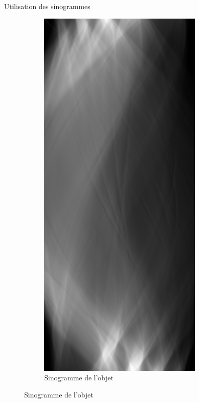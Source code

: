 \documentclass{beamer}
\begin{document}
\begin{frame}{Utilisation des sinogrammes}
\begin{figure}[t]
\begin{subfigure}[b]{0.22\textwidth}
            \includegraphics[width=\textwidth]{sino_main.png}
            \caption{Sinogramme de l'objet}
        \end{subfigure}
    \end{figure}
\end{frame}
\end{document}
